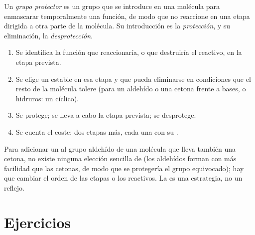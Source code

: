 \begin{definition}\label{def:b1:acetals-protection:protecting-group}
Un \emph{grupo protector} es un grupo que se
introduce en una molécula para enmascarar temporalmente una función, de
modo que no reaccione en una etapa dirigida a otra parte de la molécula.
Su introducción es la \emph{protección}, y su eliminación,
la \emph{desprotección}.
\end{definition}

\begin{method}\label{met:b1:acetals-protection:protect}
\begin{enumerate}
  \item Se identifica la función que reaccionaría, o que destruiría el
        reactivo, en la etapa prevista.
  \item Se elige un  estable en esa etapa y que pueda
        eliminarse en condiciones que el resto de la molécula tolere
        (para un aldehído o una cetona frente a bases,  o
        hidruros: un  cíclico).
  \item Se protege; se lleva a cabo la etapa prevista; se desprotege.
  \item Se cuenta el coste: dos etapas más, cada una con su .
\end{enumerate}
\end{method}

\begin{example}\label{ex:b1:acetals-protection:ketoester}
Para adicionar un  al grupo aldehído de una molécula
que lleva también una cetona, no existe ninguna elección sencilla de
 (los aldehídos forman  con más facilidad que las cetonas,
de modo que se protegería el grupo equivocado); hay que cambiar el orden
de las etapas o los reactivos. La  es una estrategia, no un
reflejo.
\end{example}

\section{Ejercicios}

